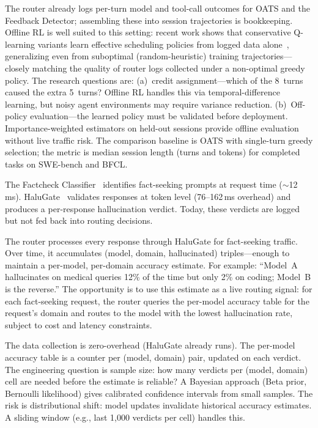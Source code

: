\begin{opportunity}
\begin{frisk}
The router already logs per-turn model and tool-call outcomes for
OATS and the Feedback Detector; assembling these into session
trajectories is bookkeeping.  Offline RL is well suited to this
setting: recent work shows that conservative Q-learning variants
learn effective scheduling policies from logged data
alone~\cite{offlinerl2025scheduling}, generalizing even from
suboptimal (random-heuristic) training trajectories---closely
matching the quality of router logs collected under a non-optimal
greedy policy.  The research questions are:
(a)~credit assignment---which of the 8~turns caused the extra
5~turns?  Offline RL handles this via temporal-difference learning,
but noisy agent environments may require variance reduction.
(b)~Off-policy evaluation---the learned policy must be validated
before deployment.  Importance-weighted estimators on held-out
sessions provide offline evaluation without live traffic risk.
The comparison baseline is OATS with single-turn greedy selection;
the metric is median session length (turns and tokens) for
completed tasks on SWE-bench and BFCL.
\end{frisk}
\end{opportunity}

\begin{opportunity}
\label{opp:halugate-reputation}
The Factcheck Classifier~\cite{factcheck2026} identifies
fact-seeking prompts at request time ($\sim$12\,ms).
HaluGate~\cite{halugate2025} validates responses at token level
(76--162\,ms overhead) and produces a per-response hallucination
verdict.  Today, these verdicts are logged but not fed back into
routing decisions.

The router processes every response through HaluGate for
fact-seeking traffic.  Over time, it accumulates (model, domain,
hallucinated) triples---enough to maintain a per-model,
per-domain accuracy estimate.  For example: ``Model~A hallucinates
on medical queries 12\% of the time but only 2\% on coding;
Model~B is the reverse.''  The opportunity is to use this estimate
as a live routing signal: for each fact-seeking request, the
router queries the per-model accuracy table for the request's
domain and routes to the model with the lowest hallucination rate,
subject to cost and latency constraints.

\begin{frisk}
The data collection is zero-overhead (HaluGate already runs).
The per-model accuracy table is a counter per (model, domain) pair,
updated on each verdict.  The engineering question is sample
size: how many verdicts per (model, domain) cell are needed before
the estimate is reliable?  A Bayesian approach (Beta prior,
Bernoulli likelihood) gives calibrated confidence intervals from
small samples.  The risk is distributional shift: model updates
invalidate historical accuracy estimates.  A sliding window
(e.g., last 1,000 verdicts per cell) handles this.
\end{frisk}
\end{opportunity}

